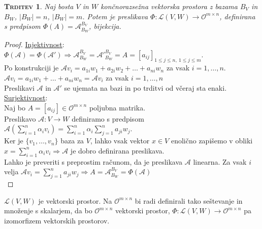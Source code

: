 \documentclass[a4paper,12pt]{article}
\newtheorem*{trditev}{\textsc{Trditev}}
\begin{document}
\begin{trditev}
	Naj bosta $V$ in $W$ končnorazsežna vektorska prostora z bazama $B_V$ in $B_W$, $|B_W|=n$, $|B_W|=m$. Potem je preslikava $\Phi: \mathcal{L}(V,W)\to \mathcal{O}^{m\times n}$, definirana s \linebreak predpisom $\Phi(A)=\mathcal{A}^{B_V}_{B_W}$, bijekcija. \\
\end{trditev}
\begin{proof}
	\underline{Injektivnost}:\\

	$\Phi(\mathcal{A})=\Phi(\mathcal{A}')\Rightarrow\mathcal{A}^{B_V}_{B_W}=\mathcal{A}'^{B_V}_{B_W}=A=[a_{ij}]_{1\leq j \leq n,~1\leq j \leq m}$. \\

	Po konstrukciji je $\mathcal{A}v_i=a_{1i}w_1+a_{2i}w_2+\ldots+a_{ni}w_n$ za vsak $i=1,\ldots,n$.\\

	$\mathcal{A}v_i=a_{1i}w_1+\ldots+a_{ni}w_n=\mathcal{A}v_i$ za vsak $i=1,\ldots,n$\\

	Preslikavi $\mathcal{A}$ in $\mathcal{A}'$ se ujemata na bazi in po trditvi od včeraj sta enaki. \\

	\underline{Surjektivnost}:\\

	Naj bo $A=[a_{ij}]\in \mathcal{O}^{m\times n}$ poljubna matrika. \\

	Preslikavo $\mathcal{A}:V\to W$ definiramo s predpisom $\mathcal{A}(\sum_{i=1}^n \alpha_i v_i)=\sum_{i=1}^n \alpha_i \sum_{j=1}^n a_{ji}w_j$.\\

	Ker je $\{v_1,\ldots,v_n\}$ baza za $V$, lahko vsak vektor $x\in V$ enolično zapišemo v obliki \linebreak  $x=\sum_{i=1}^n \alpha_i v_i \Rightarrow \mathcal{A}$ je dobro definirana preslikava. \\
	
	Lahko je preveriti s preprostim računom, da je preslikava $\mathcal{A}$ linearna. Za vsak $i$ velja $\mathcal{A}v_i=\sum_{j=1}^n a_{ji}w_j \Rightarrow A=\mathcal{A}^{B_V}_{B_W}=\Phi(\mathcal{A})$\\
\end{proof}

$\mathcal{L}(V,W)$ je vektorski prostor.
Na $\mathcal{O}^{m\times n}$ bi radi definirali tako seštevanje in množenje s skalarjem, da bo $\mathcal{O}^{m\times n}$ vektorski prostor, $\Phi: \mathcal{L}(V,W)\to \mathcal{O}^{m\times n}$ pa izomorfizem vektorskih prostorov.\\
\end{document}
